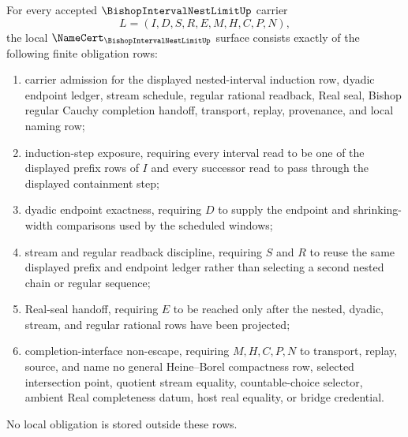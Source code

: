\begin{theorem}
\label{thm:bishop-interval-nest-limit-namecert-obligations}
For every accepted $\BishopIntervalNestLimitUp$ carrier
$$
L=(I,D,S,R,E,M,H,C,P,N),
$$
the local $\NameCert_{\BishopIntervalNestLimitUp}$ surface consists exactly of the following finite obligation rows:
\begin{enumerate}
\item carrier admission for the displayed nested-interval induction row, dyadic endpoint ledger, stream schedule, regular rational readback, Real seal, Bishop regular Cauchy completion handoff, transport, replay, provenance, and local naming row;
\item induction-step exposure, requiring every interval read to be one of the displayed prefix rows of $I$ and every successor read to pass through the displayed containment step;
\item dyadic endpoint exactness, requiring $D$ to supply the endpoint and shrinking-width comparisons used by the scheduled windows;
\item stream and regular readback discipline, requiring $S$ and $R$ to reuse the same displayed prefix and endpoint ledger rather than selecting a second nested chain or regular sequence;
\item Real-seal handoff, requiring $E$ to be reached only after the nested, dyadic, stream, and regular rational rows have been projected;
\item completion-interface non-escape, requiring $M,H,C,P,N$ to transport, replay, source, and name no general Heine--Borel compactness row, selected intersection point, quotient stream equality, countable-choice selector, ambient Real completeness datum, host real equality, or bridge credential.
\end{enumerate}
No local obligation is stored outside these rows.
\end{theorem}
